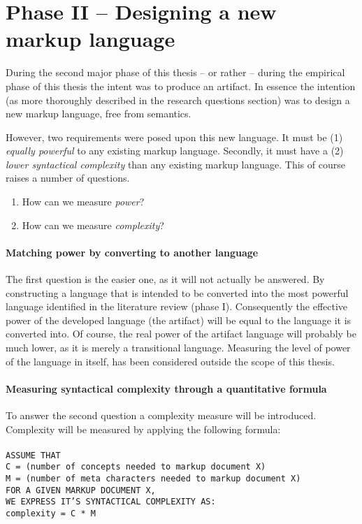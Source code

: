 \documentclass{scrreprt}
\newcommand{\tab}{\hspace*{6pt}}
\newcommand{\tabb}{\tab\tab}
\begin{document}
\section{Phase II -- Designing a new markup language}
During the second major phase of this thesis -- or rather -- during the empirical phase of this thesis the intent was to produce an artifact. In essence the intention (as more thoroughly described in the research questions section) was to design a new markup language, free from semantics.

However, two requirements were posed upon this new language. It must be (1) \emph{equally powerful} to any existing markup language. Secondly, it must have a (2) \emph{lower syntactical complexity} than any existing markup language. This of course raises a number of questions.



\begin{enumerate}
\item How can we measure \emph{power}?
\item How can we measure \emph{complexity}?
\end{enumerate}

\paragraph{Matching power by converting to another language}
The first question is the easier one, as it will not actually be answered. By constructing a language that is intended to be converted into the most powerful language identified in the literature review (phase I). Consequently the effective power of the developed language (the artifact) will be equal to the language it is converted into. Of course, the real power of the artifact language will probably be much lower, as it is merely a transitional language. Measuring the level of power of the language in itself, has been considered outside the scope of this thesis.

\paragraph{Measuring syntactical complexity through a quantitative formula}
To answer the second question a complexity measure will be introduced. Complexity will be measured by applying the following formula:\\\\
\texttt{ASSUME THAT}\\
\texttt{\tabb C = (number of concepts needed to markup document X) }\\
\texttt{\tabb M = (number of meta characters needed to markup document X) }\\
\texttt{FOR A GIVEN MARKUP DOCUMENT X, }\\
\texttt{WE EXPRESS IT'S SYNTACTICAL COMPLEXITY AS: }\\
\texttt{\tabb complexity = C * M }
\end{document}
